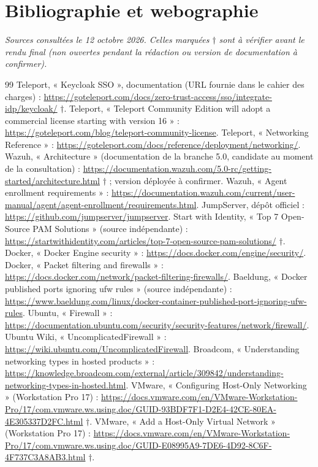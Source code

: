 \documentclass[11pt,a4paper]{report}
\begin{document}
\chapter*{Bibliographie et webographie}
\small
\textit{Sources consultées le 12 octobre 2026. Celles marquées $\dagger$ sont à vérifier avant le rendu final (non ouvertes pendant la rédaction ou version de documentation à confirmer).}
\begin{thebibliography}{99}
 Teleport, « Keycloak SSO », documentation (URL fournie dans le cahier des charges) : \url{https://goteleport.com/docs/zero-trust-access/sso/integrate-idp/keycloak/} $\dagger$.
 Teleport, « Teleport Community Edition will adopt a commercial license starting with version 16 » : \url{https://goteleport.com/blog/teleport-community-license}.
 Teleport, « Networking Reference » : \url{https://goteleport.com/docs/reference/deployment/networking/}.
 Wazuh, « Architecture » (documentation de la branche 5.0, candidate au moment de la consultation) : \url{https://documentation.wazuh.com/5.0-rc/getting-started/architecture.html} $\dagger$ ; version déployée à confirmer.
 Wazuh, « Agent enrollment requirements » : \url{https://documentation.wazuh.com/current/user-manual/agent/agent-enrollment/requirements.html}.
 JumpServer, dépôt officiel : \url{https://github.com/jumpserver/jumpserver}.
 Start with Identity, « Top 7 Open-Source PAM Solutions » (source indépendante) : \url{https://startwithidentity.com/articles/top-7-open-source-pam-solutions/} $\dagger$.
 Docker, « Docker Engine security » : \url{https://docs.docker.com/engine/security/}.
 Docker, « Packet filtering and firewalls » : \url{https://docs.docker.com/network/packet-filtering-firewalls/}.
 Baeldung, « Docker published ports ignoring ufw rules » (source indépendante) : \url{https://www.baeldung.com/linux/docker-container-published-port-ignoring-ufw-rules}.
 Ubuntu, « Firewall » : \url{https://documentation.ubuntu.com/security/security-features/network/firewall/}.
 Ubuntu Wiki, « UncomplicatedFirewall » : \url{https://wiki.ubuntu.com/UncomplicatedFirewall}.
 Broadcom, « Understanding networking types in hosted products » : \url{https://knowledge.broadcom.com/external/article/309842/understanding-networking-types-in-hosted.html}.
 VMware, « Configuring Host-Only Networking » (Workstation Pro 17) : \url{https://docs.vmware.com/en/VMware-Workstation-Pro/17/com.vmware.ws.using.doc/GUID-93BDF7F1-D2E4-42CE-80EA-4E305337D2FC.html} $\dagger$.
 VMware, « Add a Host-Only Virtual Network » (Workstation Pro 17) : \url{https://docs.vmware.com/en/VMware-Workstation-Pro/17/com.vmware.ws.using.doc/GUID-E08995A9-7DE6-4D92-8C6F-4F737C3A8AB3.html} $\dagger$.
\end{thebibliography}
\end{document}
